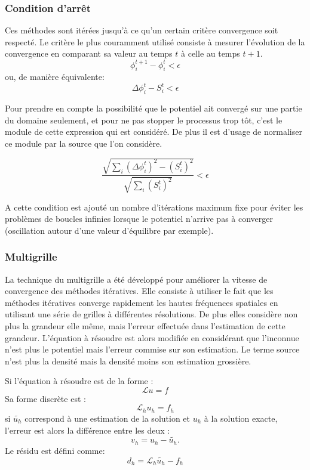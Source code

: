 \subsubsection{Condition d'arrêt}
Ces méthodes sont itérées jusqu'à ce qu'un certain critère convergence soit respecté. 
Le critère le plus couramment utilisé consiste à mesurer l'évolution de la convergence en comparant sa valeur au temps $t$ à celle au temps $t+1$.
\[ \phi^{t+1}_i - \phi^{t}_i < \epsilon \]
ou, de manière équivalente:
\[ \Delta \phi_i^t - S_i^t< \epsilon \]

Pour prendre en compte la possibilité que le potentiel ait convergé sur une partie du domaine seulement, et pour ne pas stopper le processus trop tôt, c'est le module de cette expression qui est considéré. 
De plus il est d'usage de normaliser ce module par la source que l'on considère.

\[\dfrac{ \sqrt{  \sum_i \left (  \Delta \phi_i^t \right )^2 - \left (S^t_i  \right )^2 } }{\sqrt{  \sum_i  \left (S^t_i  \right )^2 } } < \epsilon \]

A cette condition est ajouté un nombre d'itérations maximum fixe pour éviter les problèmes de boucles infinies lorsque le potentiel n'arrive pas à converger (oscillation autour d'une valeur d'équilibre par exemple).

\subsubsection{Multigrille}

La technique du multigrille a été développé pour améliorer la vitesse de convergence des méthodes itératives.
Elle consiste à utiliser le fait que les méthodes itératives converge rapidement les hautes fréquences spatiales en utilisant une série de grilles à différentes résolutions.
De plus elles considère non plus la grandeur elle même, mais l'erreur effectuée dans l'estimation de cette grandeur.
L'équation à résoudre est alors modifiée en considérant que l'inconnue n'est plus le potentiel mais l'erreur commise sur son estimation. Le terme source n'est plus la densité mais la densité moins son estimation grossière.

Si l'équation à résoudre est de la forme : 
\[ \mathcal{L} u = f \]
Sa forme discrète est :
\[ \mathcal{L}_h u_h = f_h \]
si $\tilde{u_h}$ correspond à une estimation de la solution et $u_h$ à la solution exacte, l'erreur est alors la différence entre les deux : 
\[ v_h = u_h - \tilde{u_h}. \]
Le résidu est défini comme:
\[ d_h = \mathcal{L}_h \tilde{u_h} - f_h \]

